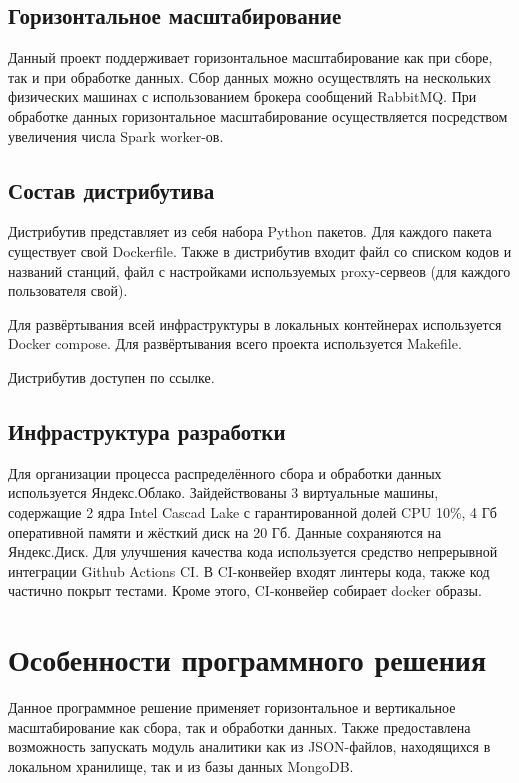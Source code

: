\documentclass[conference]{IEEEtran}
\begin{document}
\subsection{Горизонтальное масштабирование}

Данный проект поддерживает горизонтальное масштабирование как при сборе, так и при обработке данных. Сбор данных можно осуществлять на нескольких физических машинах с использованием брокера сообщений RabbitMQ. При обработке данных горизонтальное масштабирование осуществляется посредством увеличения числа Spark worker-ов.

\subsection{Состав дистрибутива}

Дистрибутив представляет из себя набора Python пакетов. Для каждого пакета существует свой Dockerfile. Также в дистрибутив входит файл со списком кодов и названий станций, файл с настройками используемых proxy-сервеов (для каждого пользователя свой).

Для развёртывания всей инфраструктуры в локальных контейнерах используется Docker compose. Для развёртывания всего проекта используется Makefile.

Дистрибутив доступен по ссылке. %

\subsection{Инфраструктура разработки}

Для организации процесса распределённого сбора и обработки данных используется Яндекс.Облако. Зайдействованы 3 виртуальные машины, содержащие 2 ядра Intel Cascad Lake с гарантированной долей CPU 10\%, 4 Гб оперативной памяти и жёсткий диск на 20 Гб. Данные сохраняются на Яндекс.Диск. Для улучшения качества кода используется средство непрерывной интеграции Github Actions CI. В CI-конвейер входят линтеры кода, также код частично покрыт тестами. Кроме этого, CI-конвейер собирает docker образы.

\section{Особенности программного решения}

Данное программное решение применяет горизонтальное и вертикальное масштабирование как сбора, так и обработки данных. Также предоставлена возможность запускать модуль аналитики как из JSON-файлов, находящихся в локальном хранилище, так и из базы данных MongoDB.
\end{document}
